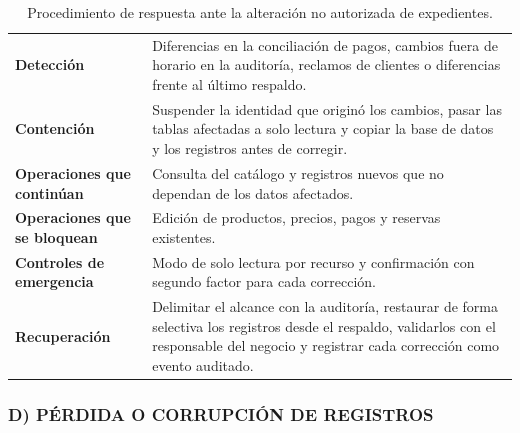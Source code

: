 \documentclass[12pt,letterpaper]{article}
\newenvironment{tabla}{\begin{singlespace}\small\setlength{\tabcolsep}{4pt}\renewcommand{\arraystretch}{1.15}}{\end{singlespace}}
\begin{document}
\begin{tabla}
\begin{longtable}{L{3.4cm}L{10.2cm}}
\caption{Procedimiento de respuesta ante la alteración no autorizada de expedientes.}\label{tab:esc_c}\\
\toprule
\textbf{Detección} & Diferencias en la conciliación de pagos, cambios fuera de horario en la auditoría, reclamos de clientes o diferencias frente al último respaldo.\\
\textbf{Contención} & Suspender la identidad que originó los cambios, pasar las tablas afectadas a solo lectura y copiar la base de datos y los registros antes de corregir.\\
\textbf{Operaciones que continúan} & Consulta del catálogo y registros nuevos que no dependan de los datos afectados.\\
\textbf{Operaciones que se bloquean} & Edición de productos, precios, pagos y reservas existentes.\\
\textbf{Controles de emergencia} & Modo de solo lectura por recurso y confirmación con segundo factor para cada corrección.\\
\textbf{Recuperación} & Delimitar el alcance con la auditoría, restaurar de forma selectiva los registros desde el respaldo, validarlos con el responsable del negocio y registrar cada corrección como evento auditado.\\
\bottomrule
\end{longtable}
\end{tabla}

\subsubsection{D) PÉRDIDA O CORRUPCIÓN DE REGISTROS}
\end{document}
